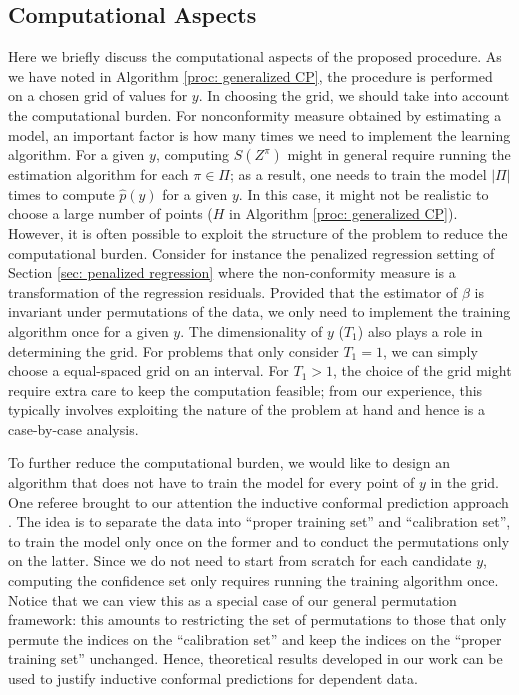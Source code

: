 \documentclass[final,12pt]{colt2018} %
\newcommand{\KW}[1]{\textcolor{cyan}{KW: #1}}
\begin{document}



\subsection{Computational Aspects}\label{sec: computation}
Here we briefly discuss the computational aspects of the proposed procedure. As we have noted in Algorithm \ref{proc: generalized CP}, the procedure is performed on a chosen grid of values for $y$. In choosing the grid, we should take into account the computational burden. For nonconformity measure obtained by estimating a model, an important factor is how many times we need to implement the learning algorithm. For a given $y$, computing $S(Z^{\pi}) $ might in general require running the estimation algorithm for each $\pi \in \Pi$; as a result, one needs to train the model $|\Pi|$ times to compute  $\hat{p}(y)$ for a given $y$. In this case, it might not be realistic to choose a large number of points ($H$ in Algorithm \ref{proc: generalized CP}). However, it is often possible to exploit the structure of the problem to reduce the computational burden. Consider for instance the penalized regression setting of Section \ref{sec: penalized regression} where the non-conformity measure is a transformation of the regression residuals. Provided that the estimator of $\beta$ is invariant under permutations of the data, we only need to implement the training algorithm once for a given $y$. The dimensionality of $y$ ($T_1$) also plays a role in determining the grid. For problems that only consider $T_1=1$, we can simply choose a equal-spaced grid on an interval. For $T_1>1$, the choice of the grid might require extra care to keep the computation feasible; from our experience, this typically involves exploiting the nature of the problem at hand and hence is a case-by-case analysis. 


To further reduce the computational burden, we would like to design an algorithm that does not have to train the model for every point of $y$ in the grid. One referee brought to our attention the inductive conformal prediction approach \citep[e.g.,][]{papadopoulos2007conformal}. The idea is to separate the data into ``proper training set'' and ``calibration set'', to train the model only once on the former and to conduct the permutations only on the latter. Since we do not need to start from scratch for each candidate $y$, computing the confidence set only requires running the training algorithm once. Notice that we can view this as a special case of our general permutation framework: this amounts to restricting the set of permutations to those that only permute the indices on the ``calibration set'' and keep the indices on the ``proper training set'' unchanged. Hence, theoretical results developed in our work can be used to justify inductive conformal predictions for dependent data. 
\end{document}
